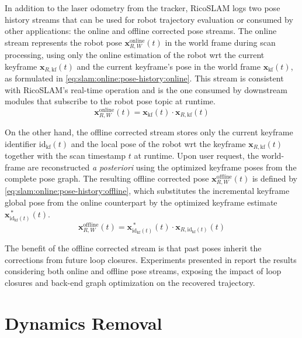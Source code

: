 In addition to the laser odometry from the tracker, RicoSLAM logs
two pose history streams that can be used for robot trajectory evaluation or
consumed by other applications: the online and offline corrected pose streams.
The online stream represents the robot pose
$\mathbf{x}_{R,W}^{\mathrm{online}}(t)$ in the world frame during
scan processing, using only the online estimation of the robot \gls{wrt}
the current keyframe $\mathbf{x}_{R,\mathrm{kf}}(t)$ and the current
keyframe's pose in the world frame $\mathbf{x}_{\mathrm{kf}}(t)$,
as formulated in \eqref{eq:slam:online:pose-history:online}. This stream is
consistent with RicoSLAM's real-time operation and is the one consumed by
downstream modules that subscribe to the robot pose topic at runtime.
\begin{equation}
\label{eq:slam:online:pose-history:online}
\mathbf{x}_{R,W}^{\mathrm{online}}(t) =
\mathbf{x}_{\mathrm{kf}}(t)\cdot\mathbf{x}_{R,\mathrm{kf}}(t)
\end{equation}

On the other hand, the offline corrected stream stores only the current keyframe
identifier $\mathrm{id}_{\mathrm{kf}}(t)$ and the local pose of the robot
\gls{wrt} the keyframe $\mathbf{x}_{R,\mathrm{kf}}(t)$ together with
the scan timestamp $t$ at runtime. Upon user request, the world-frame are
reconstructed \emph{a posteriori} using the optimized keyframe poses from the
complete pose graph. The resulting offline corrected pose
$\mathbf{x}_{R,W}^{\mathrm{offline}}(t)$ is defined by
\eqref{eq:slam:online:pose-history:offline}, which substitutes the incremental
keyframe global pose from the online counterpart by the optimized keyframe
estimate $\mathbf{x}_{\mathrm{id}_{\mathrm{kf}}(t)}^{\,*}(t)$.
\begin{equation}
\label{eq:slam:online:pose-history:offline}
\mathbf{x}_{R,W}^{\mathrm{offline}}(t) =
\mathbf{x}_{\mathrm{id}_{\mathrm{kf}}(t)}^{\,*}(t)\cdot
\mathbf{x}_{R,\mathrm{id}_{\mathrm{kf}}(t)}(t)
\end{equation}

The benefit of the offline corrected stream is that past poses
inherit the corrections from future loop closures. Experiments presented in
 report the results considering both online
and offline pose streams, exposing the impact of loop closures and
back-end graph optimization on the recovered trajectory.

\section{Dynamics Removal}\label{sec:slam:dynamics}

